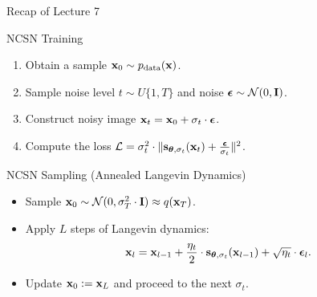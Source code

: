 \documentclass{beamer}
\begin{document}
\begin{frame}{Recap of Lecture 7}
    \begin{block}{NCSN Training}
        \begin{enumerate}
            \item Obtain a sample $\mathbf{x}_0 \sim p_{\text{data}}(\mathbf{x})$.
            \item Sample noise level $t \sim U\{1, T\}$ and noise $\boldsymbol{\epsilon} \sim \mathcal{N}(0, \mathbf{I})$.
            \item Construct noisy image $\mathbf{x}_t = \mathbf{x}_0 + \sigma_t \cdot \boldsymbol{\epsilon}$.
            \item Compute the loss $ \mathcal{L} = \sigma_t^2 \cdot \| \mathbf{s}_{\boldsymbol{\theta}, \sigma_t}(\mathbf{x}_t) + \frac{\boldsymbol{\epsilon}}{\sigma_t} \|^2 $.
        \end{enumerate}
    \end{block}
    \begin{block}{NCSN Sampling (Annealed Langevin Dynamics)}
        \begin{itemize}
            \item Sample $\mathbf{x}_0 \sim \mathcal{N}(0, \sigma_T^2 \cdot \mathbf{I}) \approx q(\mathbf{x}_T)$.
            \item Apply $L$ steps of Langevin dynamics:
            \vspace{-0.2cm}
            \[
                \mathbf{x}_l = \mathbf{x}_{l-1} + \frac{\eta_t}{2} \cdot \mathbf{s}_{\boldsymbol{\theta}, \sigma_t}(\mathbf{x}_{l - 1}) + \sqrt{\eta_t} \cdot \boldsymbol{\epsilon}_l.
            \] 
            \vspace{-0.5cm}
            \item Update $\mathbf{x}_0 := \mathbf{x}_L$ and proceed to the next $\sigma_t$.
        \end{itemize}
    \end{block}
\end{frame}
\end{document}

